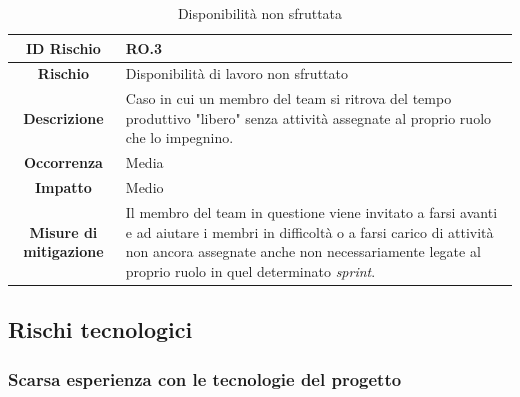 \documentclass[10pt, a4paper]{article}
\begin{document}
{{{\renewcommand{\arraystretch}{1.5}
\begin{table}[H]
\begin{tabularx}{\textwidth}{c|X}
\textbf{ID Rischio} & RO.3 \\
\hline
\textbf{Rischio} & Disponibilità di lavoro non sfruttato \\
\hline
\textbf{Descrizione} & Caso in cui un membro del team si ritrova del tempo produttivo "libero" senza attività assegnate al proprio ruolo che lo impegnino.\\
\hline
\textbf{Occorrenza} & Media\\
\hline
\textbf{Impatto} & Medio\\
\hline
\textbf{Misure di mitigazione} & Il membro del team in questione viene invitato a farsi avanti e ad aiutare i membri in difficoltà o a farsi carico di attività non ancora assegnate anche non necessariamente legate al proprio ruolo in quel determinato \textit{sprint}. \\

\end{tabularx}
\caption{Disponibilità non sfruttata}
\end{table}




\subsection{Rischi tecnologici}
\subsubsection{Scarsa esperienza con le tecnologie del progetto}

}}}
\end{document}
